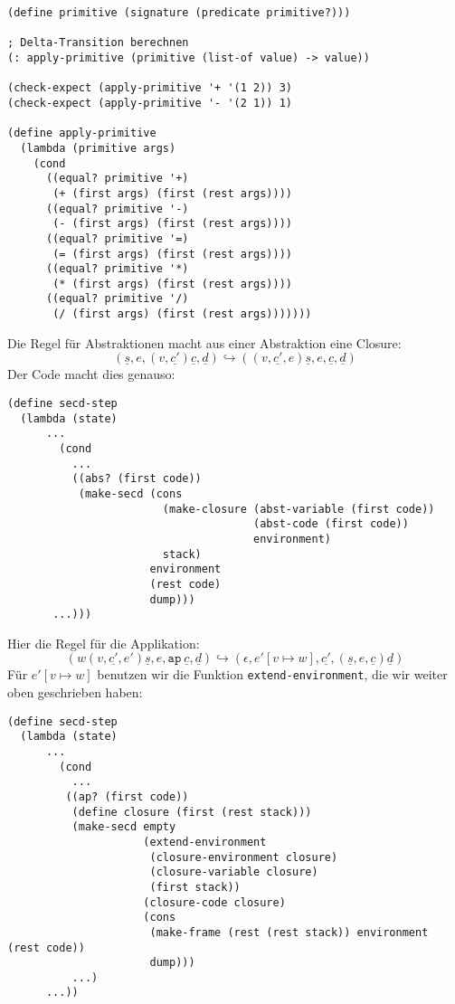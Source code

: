 \begin{lstlisting}
(define primitive (signature (predicate primitive?)))

; Delta-Transition berechnen
(: apply-primitive (primitive (list-of value) -> value))

(check-expect (apply-primitive '+ '(1 2)) 3)
(check-expect (apply-primitive '- '(2 1)) 1)

(define apply-primitive
  (lambda (primitive args)
    (cond
      ((equal? primitive '+)
       (+ (first args) (first (rest args))))
      ((equal? primitive '-)
       (- (first args) (first (rest args))))
      ((equal? primitive '=)
       (= (first args) (first (rest args))))
      ((equal? primitive '*)
       (* (first args) (first (rest args))))
      ((equal? primitive '/)
       (/ (first args) (first (rest args)))))))
\end{lstlisting}
%
Die Regel für Abstraktionen macht aus einer Abstraktion eine Closure:
\begin{displaymath}
  (\underline{s}, e, (v, \underline{c'}) \underline{c}, \underline{d})
  \hookrightarrow
  ((v, \underline{c'}, e) \underline{s}, e, \underline{c}, \underline{d})
\end{displaymath}
%
Der Code macht dies genauso:
%
\begin{lstlisting}
(define secd-step
  (lambda (state)
      ...
        (cond
          ...
          ((abs? (first code))
           (make-secd (cons
                        (make-closure (abst-variable (first code))
                                      (abst-code (first code))
                                      environment)
                        stack)
                      environment
                      (rest code)
                      dump)))
       ...)))
\end{lstlisting}
%
Hier die Regel für die Applikation:
%
\begin{displaymath}
  (w (v,\underline{c'}, e') \underline{s}, e, \mathtt{ap}~\underline{c}, \underline{d})
  \hookrightarrow
  (\epsilon, e'[v\mapsto w], \underline{c'}, (\underline{s}, e, \underline{c}) \underline{d})
\end{displaymath}
%
Für $e'[v\mapsto w]$ benutzen wir die Funktion
\lstinline{extend-environment}, die wir weiter oben geschrieben haben:
%
\begin{lstlisting}
(define secd-step
  (lambda (state)
      ...
        (cond
          ...
         ((ap? (first code))
          (define closure (first (rest stack)))
          (make-secd empty  
                     (extend-environment
                      (closure-environment closure)
                      (closure-variable closure)
                      (first stack))
                     (closure-code closure)
                     (cons
                      (make-frame (rest (rest stack)) environment (rest code))
                      dump)))
          ...)
      ...))
\end{lstlisting}
